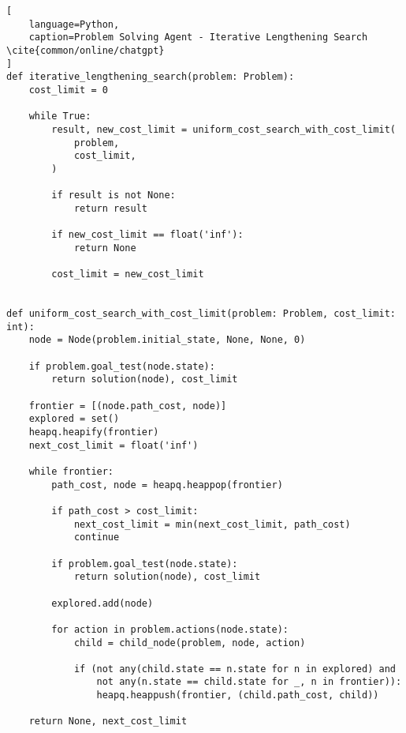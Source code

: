 \begin{lstlisting}[
    language=Python,
    caption=Problem Solving Agent - Iterative Lengthening Search \cite{common/online/chatgpt}
]
def iterative_lengthening_search(problem: Problem):
    cost_limit = 0

    while True:
        result, new_cost_limit = uniform_cost_search_with_cost_limit(
            problem,
            cost_limit,
        )

        if result is not None:
            return result

        if new_cost_limit == float('inf'):
            return None

        cost_limit = new_cost_limit


def uniform_cost_search_with_cost_limit(problem: Problem, cost_limit: int):
    node = Node(problem.initial_state, None, None, 0)

    if problem.goal_test(node.state):
        return solution(node), cost_limit

    frontier = [(node.path_cost, node)]
    explored = set()
    heapq.heapify(frontier)
    next_cost_limit = float('inf')

    while frontier:
        path_cost, node = heapq.heappop(frontier)

        if path_cost > cost_limit:
            next_cost_limit = min(next_cost_limit, path_cost)
            continue

        if problem.goal_test(node.state):
            return solution(node), cost_limit

        explored.add(node)

        for action in problem.actions(node.state):
            child = child_node(problem, node, action)

            if (not any(child.state == n.state for n in explored) and
                not any(n.state == child.state for _, n in frontier)):
                heapq.heappush(frontier, (child.path_cost, child))

    return None, next_cost_limit
\end{lstlisting}






